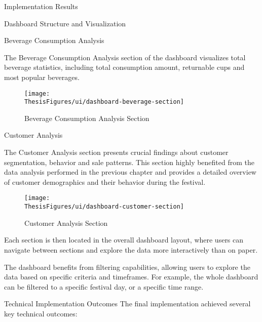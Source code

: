 \begin{section}{Implementation Results}
\begin{subsection}{Dashboard Structure and Visualization}
		\begin{subsubsection}{Beverage Consumption Analysis}
			\label{subsubsec:implementation-results-structure-beverage}

			The Beverage Consumption Analysis section of the dashboard visualizes total beverage statistics, including total consumption amount, returnable cups and most popular beverages.

			\begin{figure}[H]
				\centering
				\texttt{[image: \\ThesisFigures/ui/dashboard-beverage-section]}
				\caption{Beverage Consumption Analysis Section}
				\label{fig:dashboard-beverage-sales}
			\end{figure}
		\end{subsubsection}

		\begin{subsubsection}{Customer Analysis}
			\label{subsubsec:implementation-results-structure-customer}

			The Customer Analysis section presents crucial findings about customer segmentation, behavior and sale patterns.
			This section highly benefited from the data analysis performed in the previous chapter and provides a detailed overview of customer demographics and their behavior during the festival.

			\begin{figure}[H]
				\centering
				\texttt{[image: \\ThesisFigures/ui/dashboard-customer-section]}
				\caption{Customer Analysis Section}
				\label{fig:dashboard-customer-behavior}
			\end{figure}
		\end{subsubsection}

		Each section is then located in the overall dashboard layout, where users can navigate between sections and explore the data more interactively than on paper.

		The dashboard benefits from filtering capabilities, allowing users to explore the data based on specific criteria and timeframes.
		For example, the whole dashboard can be filtered to a specific festival day, or a specific time range.
	\end{subsection}

	\begin{subsection}{Technical Implementation Outcomes}
		\label{subsec:implementation-results-technical}
		The final implementation achieved several key technical outcomes:


\end{subsection}
\end{section}
